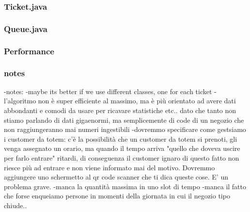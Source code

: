 
\subsubsection*{Ticket.java}
\label{subsubsect:ticketjava}


\subsubsection*{Queue.java}
\label{subsubsect:queuejava}


\subsubsection{Performance}
\label{subsubsect:performance}

\subsubsection{notes}
\label{subsubsect:notes}

-notes: 
    -maybe its better if we use different classes, one for each ticket
    -l'algoritmo non è super efficiente al massimo, ma è più orientato ad avere dati abbondanti e comodi da usare per ricavare statistiche etc.. dato che tanto non stiamo parlando di dati gigaenormi, ma semplicemente di code di un negozio che non raggiungeranno mai numeri ingestibili
    -dovremmo specificare come gestsiamo i customer da totem: c'è la possibilità che un customer da totem si prenoti, gli venga assegnato un orario, ma quando il tempo arriva "quello che doveva uscire per farlo entrare" ritardi, di conseguenza il customer ignaro di questo fatto non riesce più ad entrare e non viene informato mai del motivo. Dovremmo aggiungere uno schermetto al qr code scanner che ti dica queste cose. E' un problema grave.
    -manca la quantità massima in uno slot di tempo
    -manca il fatto che forse enqueiamo persone in momenti della giornata in cui il negozio tipo chiude..